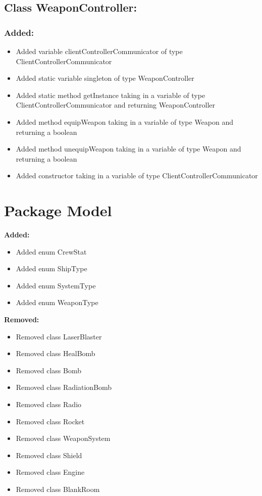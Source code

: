 \documentclass{article}
\begin{document}

\subsection{Class WeaponController:}

\subsubsection{Added:}
\begin{itemize}
\item Added variable clientControllerCommunicator of type ClientControllerCommunicator
\item Added static variable singleton of type WeaponController
\item Added static method getInstance taking in a variable of type ClientControllerCommunicator and returning WeaponController
\item Added method equipWeapon taking in a variable of type Weapon and returning a boolean
\item Added method unequipWeapon taking in a variable of type Weapon and returning a boolean
\item Added constructor taking in a variable of type ClientControllerCommunicator
\end{itemize}


\section{Package Model}

\textbf{Added:}
\begin{itemize}
\item Added enum CrewStat
\item Added enum ShipType
\item Added enum SystemType
\item Added enum WeaponType
\end{itemize}

\textbf{Removed:}
\begin{itemize}
\item Removed class LaserBlaster
\item Removed class HealBomb
\item Removed class Bomb
\item Removed class RadiationBomb
\item Removed class Radio
\item Removed class Rocket
\item Removed class WeaponSystem
\item Removed class Shield
\item Removed class Engine
\item Removed class BlankRoom
\end{itemize}
\end{document}
